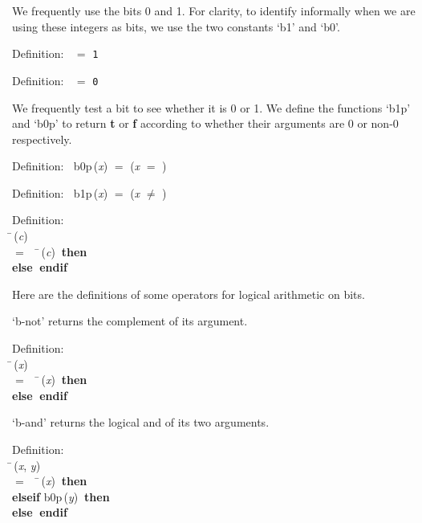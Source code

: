  We frequently use the bits 0 and 1.  For clarity, to identify informally
 when we are using these integers as bits, we use the two constants `b1'
 and `b0'.

\begin{tabbing}{\sc Definition}:$\;\;$
{} $=$ {\tt{1}}
\end{tabbing}

\begin{tabbing}{\sc Definition}:$\;\;$
{} $=$ {\tt{0}}
\end{tabbing}

 We frequently test a bit to see whether it is 0 or 1.  We define
 the functions `b1p' and `b0p' to return {\bf{t}} or {\bf{f}} according to whether
 their arguments are 0 or non-0 respectively.
\begin{tabbing}{\sc Definition}:$\;\;$
{\rm{b0p}}\,({\it{x\/}}) $=$ ({\it{x\/}} $=$ {})
\end{tabbing}

\begin{tabbing}{\sc Definition}:$\;\;$
{\rm{b1p}}\,({\it{x\/}}) $=$ ({\it{x\/}} $\not=$ {})
\end{tabbing}

\begin{tabbing}{\sc Definition}: \\  
\=\,({\it{c\/}}) \\ 
$=$$\;\;\;\;$\=\,({\it{c\/}})$\;\;${\bf then }{} \\ 
{\bf else }{}$\;${\bf  endif}\-\-
\end{tabbing}

 Here are the definitions of some operators for logical arithmetic on bits.

 `b-not' returns the complement of its argument.
\begin{tabbing}{\sc Definition}: \\  
\=\,({\it{x\/}}) \\ 
$=$$\;\;\;\;$\=\,({\it{x\/}})$\;\;${\bf then }{} \\ 
{\bf else }{}$\;${\bf  endif}\-\-
\end{tabbing}

 `b-and' returns the logical and of its two arguments.
\begin{tabbing}{\sc Definition}: \\  
\=\,({\it{x\/}}, {\it{y\/}}) \\ 
$=$$\;\;\;\;$\=\,({\it{x\/}})$\;\;${\bf then }{} \\ 
{\bf elseif }{\rm{b0p}}\,({\it{y\/}})$\;\;${\bf then }{} \\ 
{\bf else }{}$\;${\bf  endif}\-\-
\end{tabbing}


